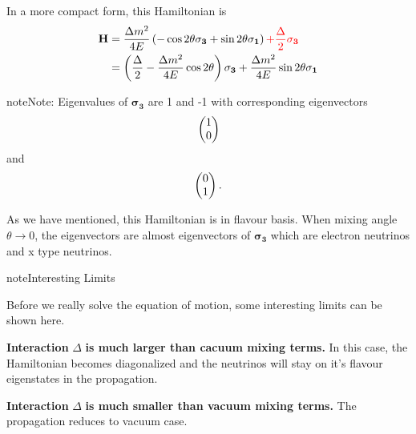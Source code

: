\documentclass[letterpaper,12pt,english]{sphinxmanual}
\begin{document}
In a more compact form, this Hamiltonian is
\begin{gather}
\begin{split}\mathbf H &= \frac{ \Delta m^2 }{4E} \left( -\cos 2\theta \mathbf {\sigma_3 } + \sin 2\theta \mathbf{\sigma_1} \right)  {\color{red} + \frac{\Delta}{2} \mathbf {\sigma_3}} \\
& = \left(\frac{\Delta}{2} -\frac{ \Delta m^2 }{4E} \cos 2\theta\right) \mathbf {\sigma_3 } + \frac{ \Delta m^2 }{4E} \sin 2\theta \mathbf{\sigma_1}\end{split}\notag
\end{gather}
\begin{notice}{note}{Note:}
Eigenvalues of \(\mathbf {\sigma_3}\) are 1 and -1 with corresponding eigenvectors
\begin{gather}
\begin{split}\begin{pmatrix}1\\ 0 \end{pmatrix}\end{split}\notag
\end{gather}
and
\begin{gather}
\begin{split}\begin{pmatrix}0\\ 1 \end{pmatrix}.\end{split}\notag
\end{gather}\end{notice}

As we have mentioned, this Hamiltonian is in flavour basis. When mixing angle \(\theta \to 0\), the eigenvectors are almost eigenvectors of \(\mathbf{\sigma_3}\) which are electron neutrinos and x type neutrinos.

\begin{notice}{note}{Interesting Limits}

Before we really solve the equation of motion, some interesting limits can be shown here.

\textbf{Interaction} \(\Delta\) \textbf{is much larger than cacuum mixing terms.} In this case, the Hamiltonian becomes diagonalized and the neutrinos will stay on it's flavour eigenstates in the propagation.

\textbf{Interaction} \(\Delta\) \textbf{is much smaller than vacuum mixing terms.} The propagation reduces to vacuum case.
\end{notice}
\end{document}
